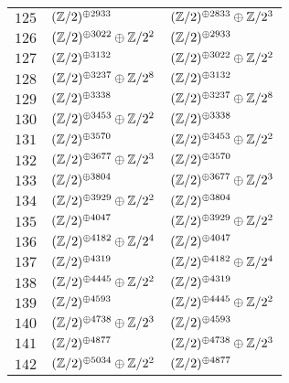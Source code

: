 \begin{supertabular}{|c|p{5.5cm}|p{5.5cm}|}
$125$%
&$(\mathbb{Z}/2)^{\oplus2933}$%
&$(\mathbb{Z}/2)^{\oplus2833}\oplus\mathbb{Z}/2^{3}$\\

$126$%
&$(\mathbb{Z}/2)^{\oplus3022}\oplus\mathbb{Z}/2^{2}$%
&$(\mathbb{Z}/2)^{\oplus2933}$\\

$127$%
&$(\mathbb{Z}/2)^{\oplus3132}$%
&$(\mathbb{Z}/2)^{\oplus3022}\oplus\mathbb{Z}/2^{2}$\\

$128$%
&$(\mathbb{Z}/2)^{\oplus3237}\oplus\mathbb{Z}/2^{8}$%
&$(\mathbb{Z}/2)^{\oplus3132}$\\

$129$%
&$(\mathbb{Z}/2)^{\oplus3338}$%
&$(\mathbb{Z}/2)^{\oplus3237}\oplus\mathbb{Z}/2^{8}$\\

$130$%
&$(\mathbb{Z}/2)^{\oplus3453}\oplus\mathbb{Z}/2^{2}$%
&$(\mathbb{Z}/2)^{\oplus3338}$\\

$131$%
&$(\mathbb{Z}/2)^{\oplus3570}$%
&$(\mathbb{Z}/2)^{\oplus3453}\oplus\mathbb{Z}/2^{2}$\\

$132$%
&$(\mathbb{Z}/2)^{\oplus3677}\oplus\mathbb{Z}/2^{3}$%
&$(\mathbb{Z}/2)^{\oplus3570}$\\

$133$%
&$(\mathbb{Z}/2)^{\oplus3804}$%
&$(\mathbb{Z}/2)^{\oplus3677}\oplus\mathbb{Z}/2^{3}$\\

$134$%
&$(\mathbb{Z}/2)^{\oplus3929}\oplus\mathbb{Z}/2^{2}$%
&$(\mathbb{Z}/2)^{\oplus3804}$\\

$135$%
&$(\mathbb{Z}/2)^{\oplus4047}$%
&$(\mathbb{Z}/2)^{\oplus3929}\oplus\mathbb{Z}/2^{2}$\\

$136$%
&$(\mathbb{Z}/2)^{\oplus4182}\oplus\mathbb{Z}/2^{4}$%
&$(\mathbb{Z}/2)^{\oplus4047}$\\

$137$%
&$(\mathbb{Z}/2)^{\oplus4319}$%
&$(\mathbb{Z}/2)^{\oplus4182}\oplus\mathbb{Z}/2^{4}$\\

$138$%
&$(\mathbb{Z}/2)^{\oplus4445}\oplus\mathbb{Z}/2^{2}$%
&$(\mathbb{Z}/2)^{\oplus4319}$\\

$139$%
&$(\mathbb{Z}/2)^{\oplus4593}$%
&$(\mathbb{Z}/2)^{\oplus4445}\oplus\mathbb{Z}/2^{2}$\\

$140$%
&$(\mathbb{Z}/2)^{\oplus4738}\oplus\mathbb{Z}/2^{3}$%
&$(\mathbb{Z}/2)^{\oplus4593}$\\

$141$%
&$(\mathbb{Z}/2)^{\oplus4877}$%
&$(\mathbb{Z}/2)^{\oplus4738}\oplus\mathbb{Z}/2^{3}$\\

$142$%
&$(\mathbb{Z}/2)^{\oplus5034}\oplus\mathbb{Z}/2^{2}$%
&$(\mathbb{Z}/2)^{\oplus4877}$\\


\end{supertabular}
